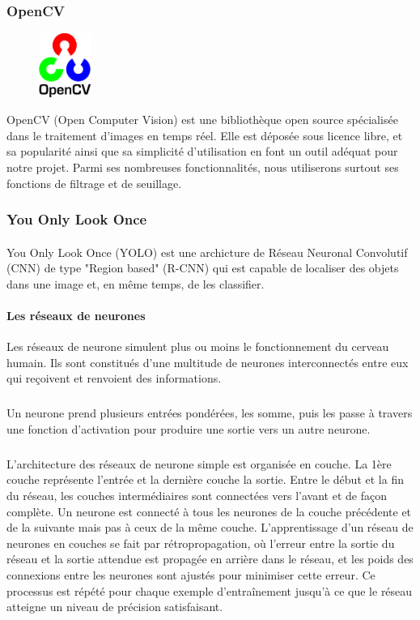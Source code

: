 \documentclass[a4paper]{article}
\begin{document}
			\subsubsection{OpenCV}
				\begin{figure}
					\includegraphics[width=0.15\textwidth]{OpenCV.png}
				\end{figure}
				OpenCV (Open Computer Vision) est une bibliothèque open source spécialisée dans le traitement d'images en temps réel.
				Elle est déposée sous licence libre, et sa popularité ainsi que sa simplicité d'utilisation en font un outil adéquat pour notre projet.
				Parmi ses nombreuses fonctionnalités, nous utiliserons surtout ses fonctions de filtrage et de seuillage.
				
				\newline
			\subsubsection{You Only Look Once}
				\paragraph{}
				You Only Look Once (YOLO) est une archicture de Réseau Neuronal Convolutif (CNN) de type "Region based" (R-CNN) qui est capable de localiser des objets dans une image et, en même temps, de les classifier.

				\paragraph{Les réseaux de neurones}
					Les réseaux de neurone simulent plus ou moins le fonctionnement du cerveau humain. Ils sont constitués d'une multitude de neurones interconnectés entre eux qui reçoivent et renvoient des informations.
					\subparagraph{} Un neurone prend plusieurs entrées pondérées, les somme, puis les passe à travers une fonction d'activation pour produire une sortie vers un autre neurone.
					\subparagraph{} L'architecture des réseaux de neurone simple est organisée en couche. La 1ère couche représente l'entrée et la dernière couche la sortie.
					Entre le début et la fin du réseau, les couches intermédiaires sont connectées vers l'avant et de façon complète. Un neurone est connecté à tous les neurones de la couche précédente et de la suivante mais pas à ceux de la même couche.
					L'apprentissage d'un réseau de neurones en couches se fait par rétropropagation, où l'erreur entre la sortie du réseau et la sortie attendue est propagée en arrière dans le réseau, et les poids des connexions entre les neurones sont ajustés pour minimiser cette erreur.
					Ce processus est répété pour chaque exemple d'entraînement jusqu'à ce que le réseau atteigne un niveau de précision satisfaisant.	
						
\end{document}
